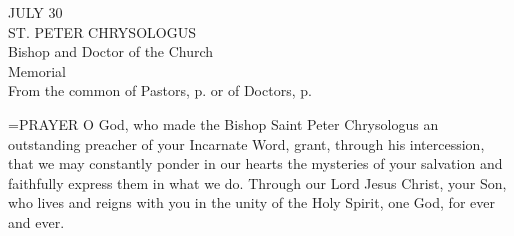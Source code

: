 \begin{center}\normalsize JULY 30\\
\footnotesize ST. PETER CHRYSOLOGUS\\
\footnotesize Bishop and Doctor of the Church\\
\footnotesize Memorial\\
\footnotesize From the common of Pastors, p.     or of Doctors, p. \\
\end{center}

\hangindent=\parindent \small{PRAYER 
O God, who made the Bishop Saint Peter Chrysologus
an outstanding preacher of your Incarnate Word,
grant, through his intercession,
that we may constantly ponder in our hearts
the mysteries of your salvation
and faithfully express them in what we do.
Through our Lord Jesus Christ, your Son,
who lives and reigns with you in the unity of the Holy Spirit,
one God, for ever and ever.\\}
 
